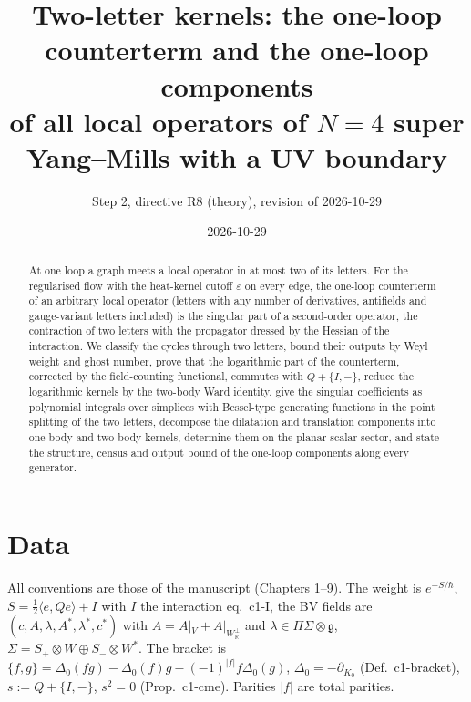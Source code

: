 \documentclass[11pt]{article}
\title{Two-letter kernels: the one-loop counterterm and the one-loop components\\ of all local operators of $N=4$ super Yang--Mills with a UV boundary}
\author{Step 2, directive R8 (theory), revision of 2026-10-29}
\date{2026-10-29}
\numberwithin{equation}{section}
\theoremstyle{plain}
\theoremstyle{definition}
\begin{document}
\maketitle

\begin{abstract}
At one loop a graph meets a local operator in at most two of its letters. For the regularised flow with the heat-kernel cutoff $\varepsilon$ on every edge, the one-loop counterterm of an arbitrary local operator (letters with any number of derivatives, antifields and gauge-variant letters included) is the singular part of a second-order operator, the contraction of two letters with the propagator dressed by the Hessian of the interaction. We classify the cycles through two letters, bound their outputs by Weyl weight and ghost number, prove that the logarithmic part of the counterterm, corrected by the field-counting functional, commutes with $Q+\{I,-\}$, reduce the logarithmic kernels by the two-body Ward identity, give the singular coefficients as polynomial integrals over simplices with Bessel-type generating functions in the point splitting of the two letters, decompose the dilatation and translation components into one-body and two-body kernels, determine them on the planar scalar sector, and state the structure, census and output bound of the one-loop components along every generator.
\end{abstract}

\tableofcontents

\section{Data}
\label{sec:tl-data}

All conventions are those of the manuscript (Chapters 1--9). The weight is $e^{+S/\hbar}$, $S=\tfrac12\langle e,Qe\rangle+I$ with $I$ the interaction eq.~c1-I, the BV fields are $(c,A,\lambda,A^*,\lambda^*,c^*)$ with $A=A|_V+A|_{W_{\mathbb R}^\perp}$ and $\lambda\in\Pi\Sigma\otimes\mathfrak g$, $\Sigma=S_+\otimes W\oplus S_-\otimes W^*$. The bracket is $\{f,g\}=\Delta_0(fg)-\Delta_0(f)g-(-1)^{|f|}f\Delta_0(g)$, $\Delta_0=-\partial_{K_0}$ (Def.~c1-bracket), $s:=Q+\{I,-\}$, $s^2=0$ (Prop.~c1-cme). Parities $|f|$ are total parities.
\end{document}
